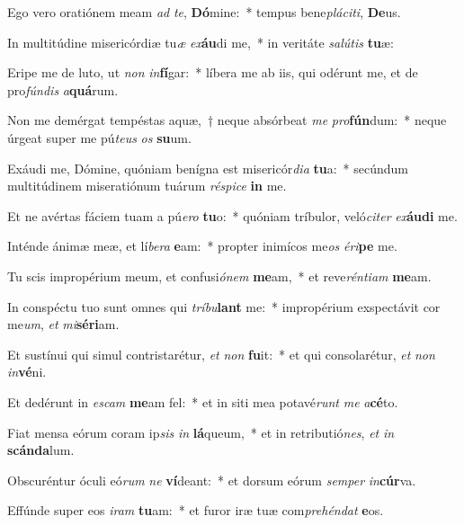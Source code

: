 \item Ego vero oratiónem meam \textit{ad} \textit{te}, \textbf{Dó}mine:~* tempus bene\textit{plá}\textit{ci}\textit{ti}, \textbf{De}us.
\item In multitúdine misericórdiæ tu\textit{æ} \textit{ex}\textbf{áu}di me,~* in veritáte \textit{sa}\textit{lú}\textit{tis} \textbf{tu}æ:
\item Eripe me de luto, ut \textit{non} \textit{in}\textbf{fí}gar:~* líbera me ab iis, qui odérunt me, et de pro\textit{fún}\textit{dis} \textit{a}\textbf{quá}rum.
\item Non me demérgat tempéstas aquæ,~† neque absórbeat \textit{me} \textit{pro}\textbf{fún}dum:~* neque úrgeat super me pú\textit{te}\textit{us} \textit{os} \textbf{su}um.
\item Exáudi me, Dómine, quóniam benígna est misericór\textit{di}\textit{a} \textbf{tu}a:~* secúndum multitúdinem miseratiónum tuárum \textit{ré}\textit{spi}\textit{ce} \textbf{in} me.
\item Et ne avértas fáciem tuam a pú\textit{e}\textit{ro} \textbf{tu}o:~* quóniam tríbulor, veló\textit{ci}\textit{ter} \textit{ex}\textbf{áu}\textbf{di} me.
\item Inténde ánimæ meæ, et lí\textit{be}\textit{ra} \textbf{e}am:~* propter inimícos me\textit{os} \textit{é}\textit{ri}\textbf{pe} me.
\item Tu scis impropérium meum, et confusi\textit{ó}\textit{nem} \textbf{me}am,~* et reve\textit{rén}\textit{ti}\textit{am} \textbf{me}am.
\item In conspéctu tuo sunt omnes qui \textit{trí}\textit{bu}\textbf{lant} me:~* impropérium exspectávit cor me\textit{um}, \textit{et} \textit{mi}\textbf{sé}\textbf{ri}am.
\item Et sustínui qui simul contristarétur, \textit{et} \textit{non} \textbf{fu}it:~* et qui consolarétur, \textit{et} \textit{non} \textit{in}\textbf{vé}ni.
\item Et dedérunt in \textit{es}\textit{cam} \textbf{me}am fel:~* et in siti mea potavé\textit{runt} \textit{me} \textit{a}\textbf{cé}to.
\item Fiat mensa eórum coram ip\textit{sis} \textit{in} \textbf{lá}queum,~* et in retributió\textit{nes}, \textit{et} \textit{in} \textbf{scán}\textbf{da}lum.
\item Obscuréntur óculi eó\textit{rum} \textit{ne} \textbf{ví}deant:~* et dorsum eórum \textit{sem}\textit{per} \textit{in}\textbf{cúr}va.
\item Effúnde super eos \textit{i}\textit{ram} \textbf{tu}am:~* et furor iræ tuæ com\textit{pre}\textit{hén}\textit{dat} \textbf{e}os.
